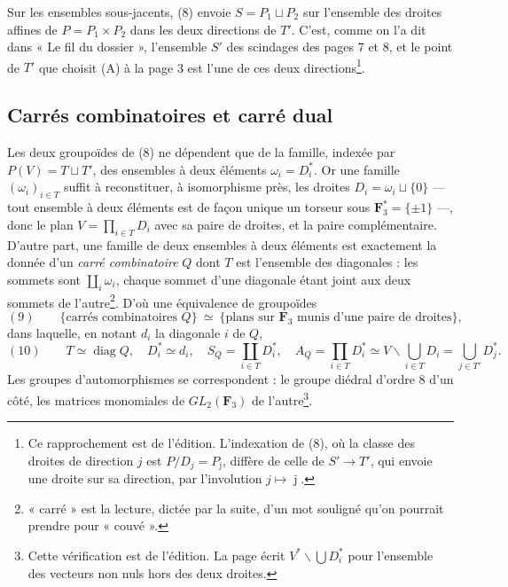 \documentclass[11pt,a4paper]{article}
\begin{document}
Sur les ensembles sous-jacents, (8) envoie $S = P_1 \sqcup P_2$ sur l'ensemble des
droites affines de $P = P_1 \times P_2$ dans les deux directions de $T'$. C'est,
comme on l'a dit dans « Le fil du dossier », l'ensemble $S'$ des scindages des
pages 7 et 8, et le point de $T'$ que choisit (A) à la page 3 est l'une de ces
deux directions\footnote{Ce rapprochement est de l'édition. L'indexation de (8),
où la classe des droites de direction $j$ est $P/D_j = P_{\bar\jmath}$, diffère de
celle de $S' \to T'$, qui envoie une droite sur sa direction, par l'involution
$j \mapsto \bar\jmath$.}.

\subsection*{Carrés combinatoires et carré dual}

Les deux groupoïdes de (8) ne dépendent que de la famille, indexée par
$P(V) = T \sqcup T'$, des ensembles à deux éléments $\omega_i = D_i^{*}$. Or une
famille $(\omega_i)_{i \in T}$ suffit à reconstituer, à isomorphisme près, les
droites $D_i = \omega_i \sqcup \{0\}$ — tout ensemble à deux éléments est de façon
unique un torseur sous $\mathbf{F}_3^{*} = \{\pm 1\}$ —, donc le plan
$V = \prod_{i \in T} D_i$ avec sa paire de droites, et la paire complémentaire.
D'autre part, une famille de deux ensembles à deux éléments est exactement la
donnée d'un \emph{carré combinatoire} $Q$ dont $T$ est l'ensemble des
diagonales : les sommets sont $\coprod_i \omega_i$, chaque sommet d'une diagonale
étant joint aux deux sommets de l'autre\footnote{« carré » est la lecture, dictée
par la suite, d'un mot souligné qu'on pourrait prendre pour « couvé ».}. D'où
une équivalence de groupoïdes
\[
(9) \qquad \{\text{carrés combinatoires } Q\} \ \simeq\
\{\text{plans sur } \mathbf{F}_3 \text{ munis d'une paire de droites}\},
\]
dans laquelle, en notant $d_i$ la diagonale $i$ de $Q$,
\[
(10) \qquad T \simeq \operatorname{diag} Q, \quad D_i^{*} \simeq d_i, \quad
S_Q = \coprod_{i \in T} D_i^{*}, \quad
A_Q = \prod_{i \in T} D_i^{*} \simeq V \smallsetminus \bigcup_{i \in T} D_i = \bigcup_{j \in T'} D_j^{*} .
\]
Les groupes d'automorphismes se correspondent : le groupe diédral d'ordre $8$ d'un
côté, les matrices monomiales de $GL_2(\mathbf{F}_3)$ de l'autre\footnote{Cette
vérification est de l'édition. La page écrit $V^{*} \smallsetminus \bigcup D_i^{*}$ pour
l'ensemble des vecteurs non nuls hors des deux droites.}.
\end{document}
